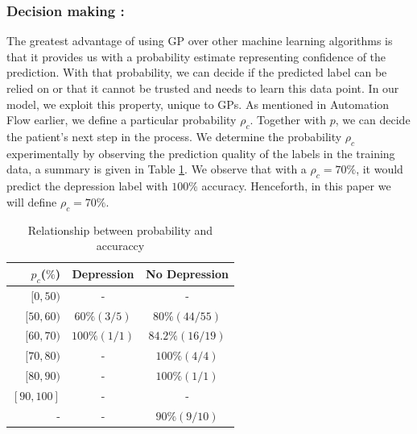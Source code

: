 \documentclass{article}
\begin{document}
	\subsubsection{Decision making :}
The greatest advantage of using GP over other machine learning algorithms is that it provides us with a probability estimate representing confidence of the prediction. 
    With that probability, we can decide if the predicted label can be relied on or that it cannot be trusted and needs to learn this data point. 
    In our model, we exploit this property, unique to GPs. 
    As mentioned in Automation Flow earlier, we define a particular probability $\rho_c$. 
    Together with $p$, we can decide the patient's next step in the process.
    We determine the probability $\rho_c$ experimentally by observing the prediction quality of the labels in the training data, a summary is given in Table \ref{tab:rho}. We observe that with a $\rho_c = 70\%$, it would predict the depression label with $100\%$ accuracy. 
    Henceforth, in this paper we will define $\rho_c = 70\%$.
	
 	\begin{table}[h]
 		\begin{center}
  			\begin{tabular}{ | r | c | c | }
    			\hline
			 	 \bfseries $p_c$($\%$)	& \bfseries Depression 	& \bfseries No Depression \\ \hline
				 $[0,50)$		& - 				& - 			 			\\ \hline
				 $[50,60)$		& $60\%(3/5)$ 	& $80\%(44/55)$ 	 	\\ \hline 
				 $[60,70)$		& $100\%(1/1)$ & $84.2\%(16/19)$ 	\\ \hline
				 $[70,80)$		& - 				& $100\%(4/4)$		 	\\ \hline
				 $[80,90)$		& - 				& $100\%(1/1)$ 	 	\\ \hline 
				 $[90,100]$		& - 				& - 			 			\\ \hline
				 -					& - 				& $90\%(9/10)$ 		\\ \hline
			 \end{tabular}
		\end{center}
 	\caption{Relationship between probability and accuraccy}
 	\label{tab:rho}
 	\end{table}
\end{document}
